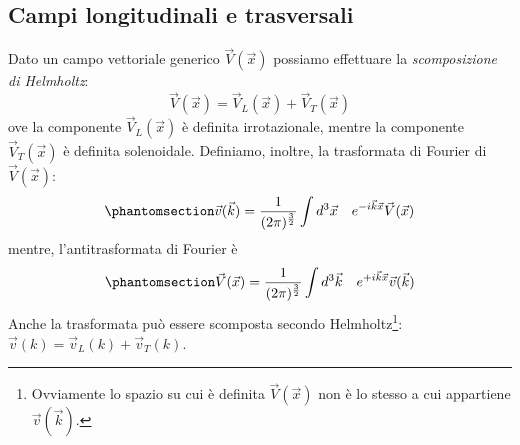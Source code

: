 \subsection{Campi longitudinali e trasversali}\label{sec:2.6}
Dato un campo vettoriale generico $\Vec{V}(\Vec{x})$ possiamo effettuare la \textit{scomposizione di Helmholtz}:
\begin{equation}
    \Vec{V}(\Vec{x})=\Vec{V}_L(\Vec{x})+\Vec{V}_T(\Vec{x})
\end{equation}
ove la componente $\Vec{V}_L(\Vec{x})$ è definita irrotazionale, mentre la componente $\Vec{V}_T(\Vec{x})$ è definita solenoidale.
Definiamo, inoltre, la trasformata di Fourier di $\Vec{V}(\Vec{x})$:
\begin{equation}\phantomsection\label{eq:Tras_fourier}
    \Vec{v}(\Vec{k})=\dfrac{1}{(2\pi)^{\frac{3}{2}}} \int d^3\Vec{x}\quad e^{-i\Vec{k}\Vec{x}}\Vec{V}(\Vec{x}) 
\end{equation}
mentre, l'antitrasformata di Fourier è
\begin{equation}\phantomsection\label{eq:Anti_fourier}
    \Vec{V}(\Vec{x})=\dfrac{1}{(2\pi)^\frac{3}{2}} \int d^3\Vec{k}\quad e^{+i\Vec{k}\Vec{x}}\Vec{v}(\Vec{k})
\end{equation}
Anche la trasformata può essere scomposta secondo Helmholtz\footnote{Ovviamente lo spazio su cui è definita $\Vec{V}(\Vec{x})$ non è lo stesso a cui appartiene $\Vec{v}(\Vec{k})$.}: $\Vec{v}(k)=\Vec{v}_L(k)+\Vec{v}_T(k)$.

